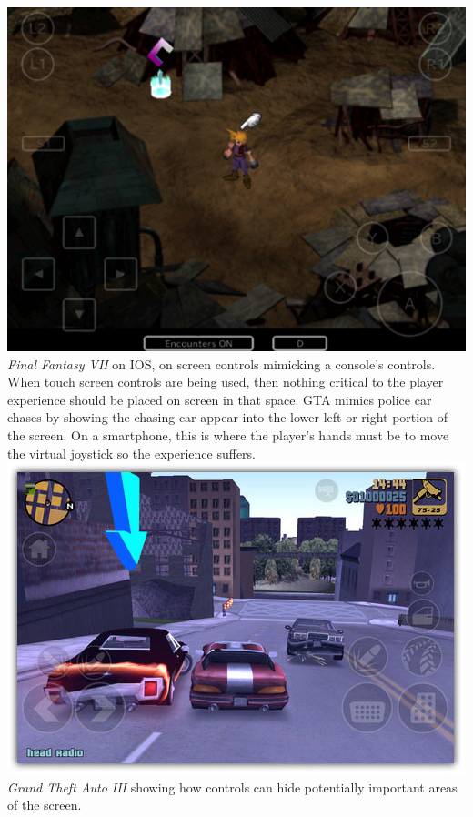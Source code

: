 \documentclass{scrartcl}
\begin{document}
\includegraphics[scale = 0.17]{FF7_IOS_Controls}\\
{
    \emph{Final Fantasy VII} on IOS, on screen controls mimicking a console's controls.
}\\


When touch screen controls are being used, then nothing critical to the player experience should be placed on screen in that space.  GTA mimics police car chases by showing the chasing car appear into the lower left or right portion of the screen.  On a smartphone, this is where the player's hands must be to move the virtual joystick so the experience suffers.  \\

\includegraphics[scale = 0.7]{GTA_IOS_Controls}\\
{
    \emph{Grand Theft Auto III} showing how controls can hide potentially important areas of the screen.
}\\
\end{document}
